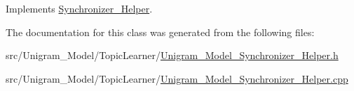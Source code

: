 Implements \hyperlink{class_synchronizer___helper_a18aca854fe152f99640556a2a4e04f96}{Synchronizer\_\-Helper}.



The documentation for this class was generated from the following files:\begin{DoxyCompactItemize}
\item 
src/Unigram\_\-Model/TopicLearner/\hyperlink{_unigram___model___synchronizer___helper_8h}{Unigram\_\-Model\_\-Synchronizer\_\-Helper.h}\item 
src/Unigram\_\-Model/TopicLearner/\hyperlink{_unigram___model___synchronizer___helper_8cpp}{Unigram\_\-Model\_\-Synchronizer\_\-Helper.cpp}\end{DoxyCompactItemize}
